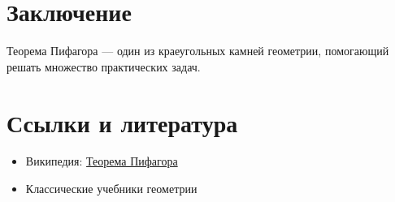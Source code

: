 \documentclass{article}
\begin{document}
\section{Заключение}
\newline Теорема Пифагора — один из краеугольных камней геометрии, помогающий решать
 множество практических задач.

\section{Ссылки и литература}
\begin{itemize}
    \item Википедия: \href{https://ru.wikipedia.org/wiki/%D0%A2%D0%B5%D0%BE%D1%80%D0%B5%D0%BC%D0%B0_%D0%9F%D0%B8%D1%84%D0%B0%D0%B3%D0%BE%D1%80%D0%B0}{Теорема Пифагора}
    \item Классические учебники геометрии
\end{itemize}
\newpage 
\end{document}

